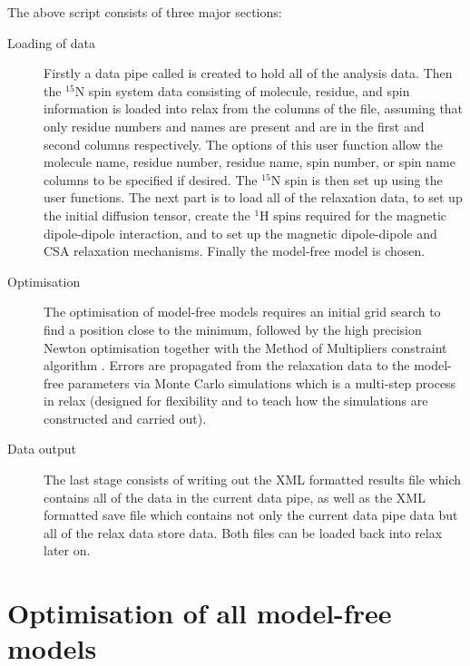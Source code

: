 \begin{htmlonly}
\begin{htmlonly}
The above script consists of three major sections:

\begin{description}
\item[Loading of data] Firstly a data pipe called  is created to hold all of the analysis data.  Then the $^{15}$N spin system data consisting of molecule, residue, and spin information is loaded into relax from the columns of the  file, assuming that only residue numbers and names are present and are in the first and second columns respectively.  The options of this  user function allow the molecule name, residue number, residue name, spin number, or spin name columns to be specified if desired.  The $^{15}$N spin is then set up using the  user functions.  The next part is to load all of the relaxation data, to set up the initial diffusion tensor, create the $^1$H spins required for the magnetic dipole-dipole interaction, and to set up the magnetic dipole-dipole and CSA relaxation mechanisms.  Finally the model-free model  is chosen.
\item[Optimisation] The optimisation of model-free models requires an initial grid search to find a position close to the minimum, followed by the high precision Newton optimisation together with the Method of Multipliers constraint algorithm \citep{dAuvergneGooley08a}.  Errors are propagated from the relaxation data to the model-free parameters via Monte Carlo simulations which is a multi-step process in relax (designed for flexibility and to teach how the simulations are constructed and carried out).
\item[Data output] The last stage consists of writing out the XML formatted results file which contains all of the data in the current data pipe, as well as the XML formatted save file which contains not only the current data pipe data but all of the relax data store data.  Both files can be loaded back into relax later on.
\end{description}




\section{Optimisation of all model-free models}




\end{htmlonly}
\end{htmlonly}
